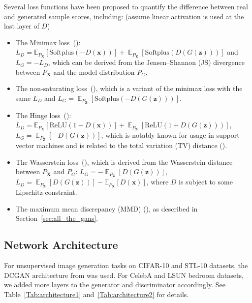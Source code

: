 \documentclass{article} %
\theoremstyle{plain}
\newtheorem*{proposition 1*}{Proposition 1}
\DeclareMathOperator{\E}{\mathbb{E}}
\newcommand{\set}[1]{\mathbb{#1}}  %
\newcommand{\rdv}[1]{\mathbf{#1}}  %
\begin{document}
\begin{appendices}
Several loss functions have been proposed to quantify the difference between real and generated sample scores, including: (assume linear activation is used at the last layer of \(D\))
\begin{itemize}[leftmargin=*]
	\item The Minimax loss~(\cite{gan}): \(L_D=\set{E}_{P_{\rdv{X}}}[\text{Softplus}(-D(\bm{x}))]+\E_{P_{\rdv{Z}}}[\text{Softplus}(D(G(\bm{z})))]\) and  \(L_G=-L_D\), which can be derived from the Jensen–Shannon (JS) divergence between \(P_{\rdv{X}}\) and the model distribution \(P_{G}\).
	\item The non-saturating loss~(\cite{gan}), which is a variant of the minimax loss with the same \(L_D\) and \(L_G=\E_{P_{\rdv{Z}}}[\text{Softplus}(-D(G(\bm{z})))]\).
	\item The Hinge loss~(\cite{implicit}):  \(L_D=\set{E}_{P_{\rdv{X}}}[\text{ReLU}(1-D(\bm{x}))]+\E_{P_{\rdv{Z}}}[\text{ReLU}(1+D(G(\bm{z})))]\), \(L_G=\E_{P_{\rdv{Z}}}[-D(G(\bm{z}))]\), which is notably known for usage in support vector machines and is related to the total variation (TV) distance (\cite{f_divergence_theory}).
	\item The Wasserstein loss~(\cite{wgan,wgan_gp}), which is derived from the Wasserstein distance between \(P_{\rdv{X}}\) and \(P_{G}\): \(L_G=-\E_{P_{\rdv{Z}}}[D(G(\bm{z}))]\), \(L_D=\E_{P_{\rdv{Z}}}[D(G(\bm{z}))]-\set{E}_{P_{\rdv{X}}}[D(\bm{x})]\), where \(D\) is subject to some Lipschitz constraint.
	\item The maximum mean discrepancy (MMD) (\cite{mmd_gan_g,mmd_gan_t}), as described in Section~\ref{sec:all_the_gans}.
\end{itemize}

\subsection{Network Architecture}
\label{sec:architecture}

For unsupervised image generation tasks on CIFAR-10 and STL-10 datasets, the DCGAN architecture from \cite{spectral} was used. For CelebA and LSUN bedroom datasets, we added more layers to the generator and discriminator accordingly. See Table~\ref{Tab:architecture1} and~\ref{Tab:architecture2} for details. 


\end{appendices}
\end{document}
